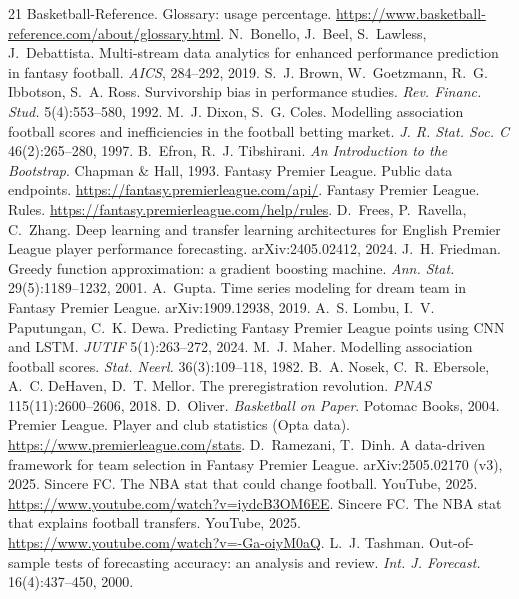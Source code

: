 \documentclass[10pt,a4paper,twocolumn]{article}
\begin{document}
{\footnotesize
\setlength{\bibsep}{1pt}
\begin{thebibliography}{21}
 Basketball-Reference. Glossary: usage percentage. \url{https://www.basketball-reference.com/about/glossary.html}.
 N.~Bonello, J.~Beel, S.~Lawless, J.~Debattista. Multi-stream data analytics for enhanced performance prediction in fantasy football. \emph{AICS}, 284--292, 2019.
 S.~J. Brown, W.~Goetzmann, R.~G. Ibbotson, S.~A. Ross. Survivorship bias in performance studies. \emph{Rev. Financ. Stud.} 5(4):553--580, 1992.
 M.~J. Dixon, S.~G. Coles. Modelling association football scores and inefficiencies in the football betting market. \emph{J. R. Stat. Soc. C} 46(2):265--280, 1997.
 B.~Efron, R.~J. Tibshirani. \emph{An Introduction to the Bootstrap}. Chapman \& Hall, 1993.
 Fantasy Premier League. Public data endpoints. \url{https://fantasy.premierleague.com/api/}.
 Fantasy Premier League. Rules. \url{https://fantasy.premierleague.com/help/rules}.
 D.~Frees, P.~Ravella, C.~Zhang. Deep learning and transfer learning architectures for English Premier League player performance forecasting. arXiv:2405.02412, 2024.
 J.~H. Friedman. Greedy function approximation: a gradient boosting machine. \emph{Ann. Stat.} 29(5):1189--1232, 2001.
 A.~Gupta. Time series modeling for dream team in Fantasy Premier League. arXiv:1909.12938, 2019.
 A.~S. Lombu, I.~V. Paputungan, C.~K. Dewa. Predicting Fantasy Premier League points using CNN and LSTM. \emph{JUTIF} 5(1):263--272, 2024.
 M.~J. Maher. Modelling association football scores. \emph{Stat. Neerl.} 36(3):109--118, 1982.
 B.~A. Nosek, C.~R. Ebersole, A.~C. DeHaven, D.~T. Mellor. The preregistration revolution. \emph{PNAS} 115(11):2600--2606, 2018.
 D.~Oliver. \emph{Basketball on Paper}. Potomac Books, 2004.
 Premier League. Player and club statistics (Opta data). \url{https://www.premierleague.com/stats}.
 D.~Ramezani, T.~Dinh. A data-driven framework for team selection in Fantasy Premier League. arXiv:2505.02170 (v3), 2025.
 Sincere FC. The NBA stat that could change football. YouTube, 2025. \url{https://www.youtube.com/watch?v=iydcB3OM6EE}.
 Sincere FC. The NBA stat that explains football transfers. YouTube, 2025. \url{https://www.youtube.com/watch?v=-Ga-oiyM0aQ}.
 L.~J. Tashman. Out-of-sample tests of forecasting accuracy: an analysis and review. \emph{Int. J. Forecast.} 16(4):437--450, 2000.
\end{thebibliography}
}
\end{document}
